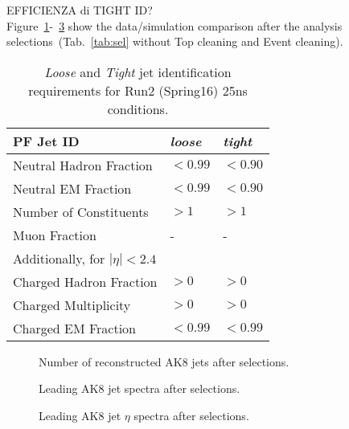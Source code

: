 {\color{red} EFFICIENZA di TIGHT ID?}\\

Figure~\ref{fig:n_AK8}-~\ref{fig:AK8jet_eta} show the data/simulation comparison after the analysis selections~(Tab.~\ref{tab:sel} without Top cleaning and Event cleaning).

\begin{table}[htb]
 \centering
 \begin{tabular}{lll}
\hline
PF Jet ID                       & \emph{loose}   & \emph{tight}   \\
\hline
Neutral Hadron Fraction         & $< 0.99  $     & $< 0.90  $    \\
Neutral EM Fraction             & $< 0.99  $     & $< 0.90  $\\
Number of Constituents          & $> 1     $     & $> 1     $\\
Muon Fraction                   & \--            & \-- \\
\hline
\multicolumn{3}{l}{Additionally, for $|\eta| < 2.4$ } \\
\hline
Charged Hadron Fraction         & $> 0   $& $> 0   $\\
Charged Multiplicity            & $> 0   $& $> 0   $\\
Charged EM Fraction             & $< 0.99$& $< 0.99$\\
\hline
 \end{tabular}
 \caption{ \emph{Loose} and \emph{Tight} jet identification requirements for Run2 (Spring16) 25ns conditions.\label{tab:JetId}}
\end{table}

\begin{figure}[!htb]
  \begin{center}
  \end{center}
  \caption{Number of reconstructed AK8 jets after selections.}
  \label{fig:n_AK8}
\end{figure}

\begin{figure}[!htb]
  \begin{center}
  \end{center}
  \caption{Leading AK8 jet \pt spectra after selections.}
  \label{fig:AK8jet_pt}
\end{figure}

\begin{figure}[!htb]
  \begin{center}
  \end{center}
  \caption{Leading AK8 jet $\eta$ spectra after selections.}
  \label{fig:AK8jet_eta}
\end{figure}



